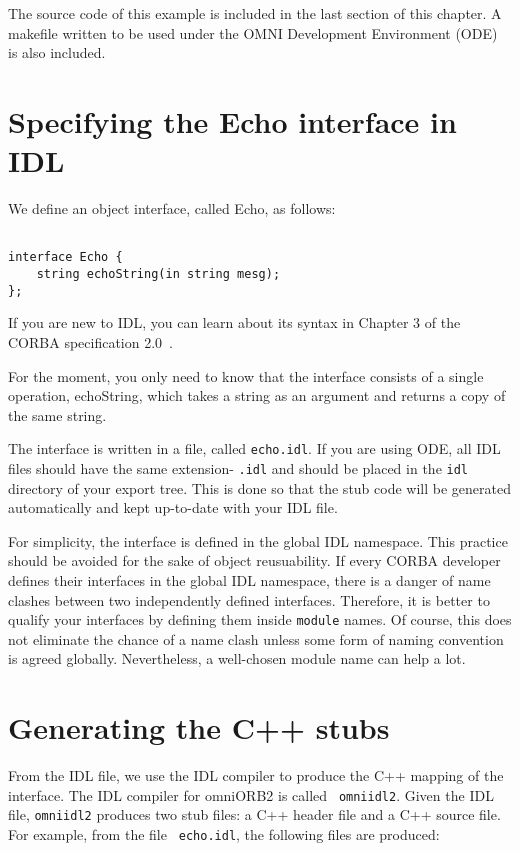 \documentclass[11pt,twoside,onecolumn]{book}
\begin{document}
The source code of this example is included in the last section of this
chapter. A makefile written to be used under the OMNI Development
Environment (ODE)~\cite{tjr96b} is also included.

\section{Specifying the Echo interface in IDL}

We define an object interface, called Echo, as follows:

{\small
\begin{verbatim}

interface Echo {
    string echoString(in string mesg);
};

\end{verbatim}
}

If you are new to IDL, you can learn about its syntax in Chapter 3 of the
CORBA specification 2.0~\cite{corba2-spec}.

For the moment, you only need to know that the interface consists of a
single operation, echoString, which takes a string as an argument and
returns a copy of the same string.

The interface is written in a file, called {\tt echo.idl}. If you are
using ODE, all IDL files should have the same
extension- {\tt.idl} and should be placed in the {\tt idl} directory of
your export tree. This is done so that the stub code will be generated
automatically and kept up-to-date with your IDL file.

For simplicity, the interface is defined in the global IDL namespace. This
practice should be avoided for the sake of object reusuability. If every
CORBA developer defines their interfaces in the global IDL namespace, there
is a danger of name clashes between two independently defined
interfaces. Therefore, it is better to qualify your interfaces by defining
them inside {\tt module} names. Of course, this does not eliminate the
chance of a name clash unless some form of naming convention is agreed
globally. Nevertheless, a well-chosen module name can help a lot.

\section{Generating the C++ stubs}

From the IDL file, we use the IDL compiler to produce the C++ mapping of
the interface. The IDL compiler for omniORB2 is called {\tt
omniidl2}. Given the IDL file, {\tt omniidl2} produces two stub files: a
C++ header file and a C++ source file. For example, from the file {\tt
echo.idl}, the following files are produced:
\end{document}
